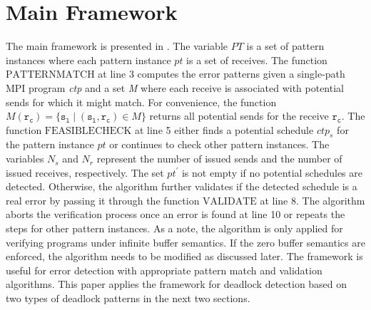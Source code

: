 \section{Main Framework}


\examplefigone

The main framework is presented in . The variable $\mathit{PT}$ is a set of pattern instances where each pattern instance $\mathit{pt}$ is a set of receives. The function $\mathrm{PATTERNMATCH}$ at line 3 computes the error patterns given a single-path MPI program \emph{ctp} and a set \emph{M} where each receive is associated with potential sends for which it might match. For convenience, the function $\mathit{M}(\mathtt{r_c}) = \{\mathtt{s_l}\mid(\mathtt{s_l},\mathtt{r_c})\in\mathit{M}\}$ returns all potential sends for the receive $\mathtt{r_c}$.  
The function $\mathrm{FEASIBLECHECK}$ at line 5 either finds a potential schedule $\mathit{ctp_s}$ for the pattern instance $\mathit{pt}$ or continues to check other pattern instances. The variables $\mathit{N_s}$ and $\mathit{N_r}$ represent the number of issued sends and the number of issued receives, respectively.
 The set $\mathit{pt^\prime}$ is not empty if no potential schedules are detected. Otherwise, the algorithm further validates if the detected schedule is a real error by passing it through the function $\mathrm{VALIDATE}$ at line 8. The algorithm aborts the verification process once an error is found at line 10 or repeats the steps for other pattern instances.
As a note, the algorithm is only applied for verifying programs under infinite buffer semantics. If the zero buffer semantics are enforced, the algorithm needs to be modified as discussed later. The framework is useful for error detection with appropriate pattern match and validation algorithms. This paper applies the framework for deadlock detection based on two types of deadlock patterns in the next two sections.

